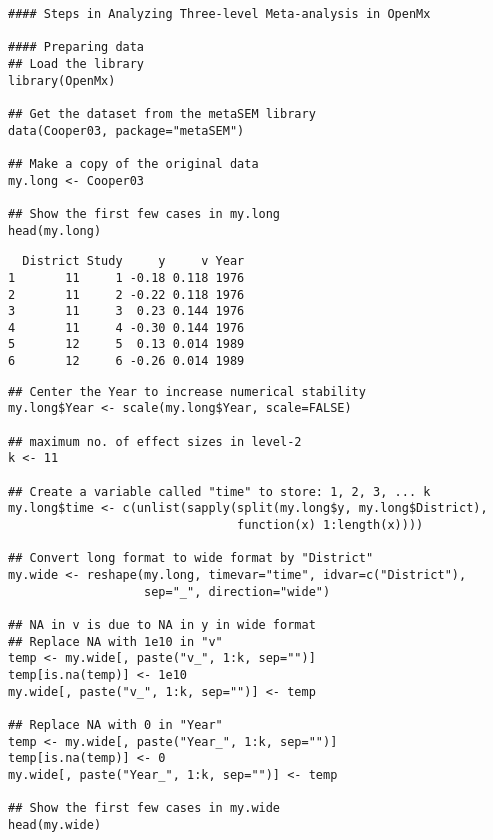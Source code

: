 \documentclass[11pt]{article}
\begin{document}
\begin{verbatim}
#### Steps in Analyzing Three-level Meta-analysis in OpenMx

#### Preparing data
## Load the library
library(OpenMx)

## Get the dataset from the metaSEM library
data(Cooper03, package="metaSEM")

## Make a copy of the original data
my.long <- Cooper03

## Show the first few cases in my.long
head(my.long)
\end{verbatim}

\begin{verbatim}
  District Study     y     v Year
1       11     1 -0.18 0.118 1976
2       11     2 -0.22 0.118 1976
3       11     3  0.23 0.144 1976
4       11     4 -0.30 0.144 1976
5       12     5  0.13 0.014 1989
6       12     6 -0.26 0.014 1989
\end{verbatim}


\begin{verbatim}
## Center the Year to increase numerical stability
my.long$Year <- scale(my.long$Year, scale=FALSE)

## maximum no. of effect sizes in level-2
k <- 11

## Create a variable called "time" to store: 1, 2, 3, ... k
my.long$time <- c(unlist(sapply(split(my.long$y, my.long$District), 
                                function(x) 1:length(x))))

## Convert long format to wide format by "District"
my.wide <- reshape(my.long, timevar="time", idvar=c("District"), 
                   sep="_", direction="wide")

## NA in v is due to NA in y in wide format
## Replace NA with 1e10 in "v"
temp <- my.wide[, paste("v_", 1:k, sep="")]
temp[is.na(temp)] <- 1e10
my.wide[, paste("v_", 1:k, sep="")] <- temp

## Replace NA with 0 in "Year"
temp <- my.wide[, paste("Year_", 1:k, sep="")]
temp[is.na(temp)] <- 0
my.wide[, paste("Year_", 1:k, sep="")] <- temp

## Show the first few cases in my.wide
head(my.wide)
\end{verbatim}
\end{document}
